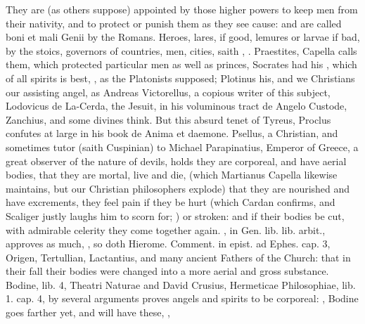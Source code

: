 {{They are (as others suppose) appointed by those higher powers to keep
men from their nativity, and to protect or punish them as they see
cause: and are called boni et mali Genii by the Romans. Heroes, lares,
if good, lemures or larvae if bad, by the stoics, governors of
countries, men, cities, saith \Apuleius{}, . Praestites, Capella calls them,
which protected particular men as well as princes, Socrates had his
, which of all spirits is best, , as the Platonists supposed;
Plotinus his, and we Christians our assisting angel, as Andreas
Victorellus, a copious writer of this subject, Lodovicus de La-Cerda,
the Jesuit, in his voluminous tract de Angelo Custode, Zanchius, and
some divines think. But this absurd tenet of Tyreus, Proclus confutes
at large in his book \textlatin{de Anima et daemone}.
Psellus, a Christian, and sometimes tutor (saith Cuspinian) to
Michael Parapinatius, Emperor of Greece, a great observer of the nature
of devils, holds they are corporeal, and have aerial bodies,
that they are mortal, live and die, (which Martianus Capella likewise
maintains, but our Christian philosophers explode) that they are
nourished and have excrements, they feel pain if they be hurt (which
Cardan confirms, and Scaliger justly laughs him to scorn for;  \etc{}) or stroken: and
if their bodies be cut, with admirable celerity they come together
again. \Austin{}, in Gen. lib.  lib. arbit., approves as much, , so doth
Hierome. Comment. in epist. ad Ephes. cap. 3, Origen, Tertullian,
Lactantius, and many ancient Fathers of the Church: that in their fall
their bodies were changed into a more aerial and gross substance.
Bodine, lib. 4, \textlatin{Theatri Naturae} and David Crusius, \textlatin{Hermeticae
Philosophiae}, lib. 1. cap. 4, by several arguments proves angels and
spirits to be corporeal: ,  Bodine
goes farther yet, and will have these, ,
}}
